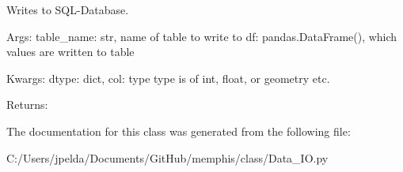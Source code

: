 \begin{DoxyVerb}Writes to SQL-Database.

Args:
    table_name: str, name of table to write to
    df: pandas.DataFrame(), which values are written to table

Kwargs:
    dtype: dict, {col: type} type is of int, float, or geometry etc.

Returns:\end{DoxyVerb}
 

The documentation for this class was generated from the following file\+:\begin{DoxyCompactItemize}
\item 
C\+:/\+Users/jpelda/\+Documents/\+Git\+Hub/memphis/class/Data\+\_\+\+I\+O.\+py\end{DoxyCompactItemize}
